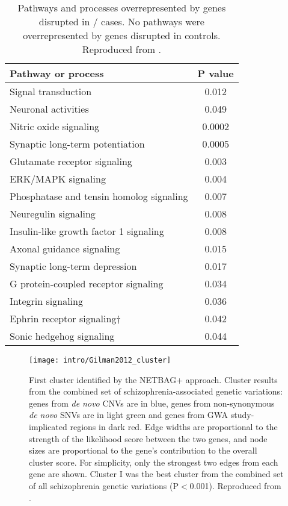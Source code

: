 \begin{table}
\centering
\begin{tabular}{l c}
\textbf{Pathway or process} & \textbf{P value} \\
\hline
Signal transduction & 0.012 \\
Neuronal activities & 0.049 \\
Nitric oxide signaling & 0.0002 \\
Synaptic long-term potentiation & 0.0005 \\
Glutamate receptor signaling & 0.003 \\
ERK/MAPK signaling & 0.004 \\
Phosphatase and tensin homolog signaling & 0.007 \\
Neuregulin signaling & 0.008 \\
Insulin-like growth factor 1 signaling & 0.008 \\
Axonal guidance signaling & 0.015 \\
Synaptic long-term depression & 0.017 \\
G protein-coupled receptor signaling & 0.034 \\
Integrin signaling & 0.036 \\
Ephrin receptor signaling† & 0.042 \\
Sonic hedgehog signaling & 0.044 \\
\end{tabular}
\caption[Pathways implicated in \scz/]{Pathways and processes overrepresented by genes disrupted in 	\scz/ cases. No pathways were overrepresented by genes disrupted in controls.
	Reproduced from \citet{Walsh2008}.}
\label{table:intro:scz:pathways}
\end{table}

\begin{figure}
	\centering
	\texttt{[image: intro/Gilman2012\_cluster]}
	\caption[First cluster identified by the NETBAG+ approach]{First cluster identified by the NETBAG+ approach.
	Cluster results from the combined set of schizophrenia-associated genetic variations: genes from \textit{de novo} \acp{CNV} are in blue, genes from non-synonymous \textit{de novo} \acp{SNV} are in light green and genes from \ac{GWA} study-implicated regions in dark red. Edge widths are proportional to the strength of the likelihood score between the two genes, and node sizes are proportional to the gene's contribution to the overall cluster score. For simplicity, only the strongest two edges from each gene are shown. Cluster I was the best cluster from the combined set of all schizophrenia genetic variations (P$<$0.001).
	Reproduced from \citet{Gilman2012}.}
	\label{fig:intro:scz:cluster}
\end{figure}

